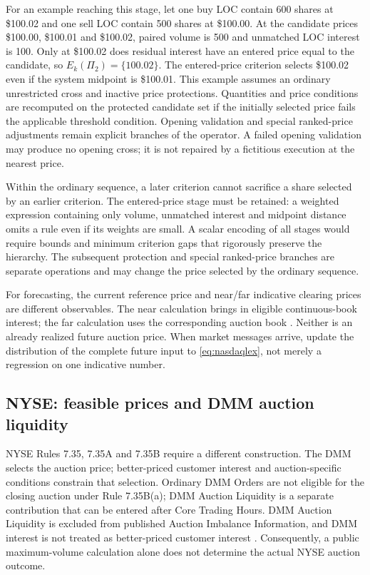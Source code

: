 \documentclass[11pt]{article}
\numberwithin{equation}{section}
\theoremstyle{definition}
\theoremstyle{remark}
\theoremstyle{definition}
\begin{document}
For an example reaching this stage, let one buy LOC contain 600 shares at
\$100.02 and one sell LOC contain 500 shares at \$100.00. At the candidate
prices \$100.00, \$100.01 and \$100.02, paired volume is 500 and unmatched
LOC interest is 100. Only at \$100.02 does residual interest have an entered
price equal to the candidate, so $E_k(\Pi_2)=\{100.02\}$. The entered-price
criterion selects \$100.02 even if the system midpoint is \$100.01.
This example assumes an ordinary unrestricted cross and inactive price protections.
 Quantities and price conditions
are recomputed on the protected candidate set if the initially selected price
fails the applicable threshold condition. Opening validation and special
ranked-price adjustments remain explicit branches of the operator. A failed
opening validation may produce no opening cross; it is not repaired by a
fictitious execution at the nearest price.

Within the ordinary sequence, a later criterion cannot sacrifice a share
selected by an earlier criterion. The entered-price stage must be retained:
a weighted expression containing only volume, unmatched interest and midpoint
distance omits a rule even if its weights are small. A scalar encoding of all
stages would require bounds and minimum criterion gaps that rigorously preserve
the hierarchy. The subsequent protection and special ranked-price branches are
separate operations and may change the price selected by the ordinary sequence.

For forecasting, the current reference price and near/far indicative clearing
prices are different observables. The near calculation brings in eligible
continuous-book interest; the far calculation uses the corresponding auction
book \citep{nasdaqcrossfaq}. Neither is an already realized future auction price.
When market messages arrive, update the distribution of the complete future
input to \eqref{eq:nasdaqlex}, not merely a regression on one indicative number.

\subsection{NYSE: feasible prices and DMM auction liquidity}

NYSE Rules 7.35, 7.35A and 7.35B require a different construction. The DMM selects
the auction price; better-priced customer interest and auction-specific
conditions constrain that selection. Ordinary DMM Orders are not eligible for the closing auction under Rule
7.35B(a); DMM Auction Liquidity is a separate contribution that can be entered
after Core Trading Hours. DMM Auction Liquidity is excluded from
published Auction Imbalance Information, and DMM interest is not treated as
better-priced customer interest \citep{nyseauctiongeneral,nyseopenrule,nysecloserule}.
Consequently, a public maximum-volume calculation alone does not determine the
actual NYSE auction outcome.
\end{document}

